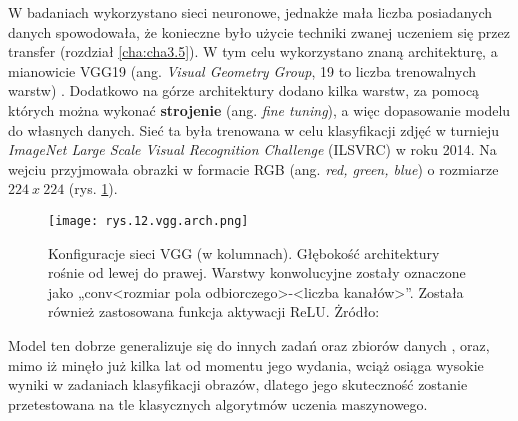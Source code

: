 W badaniach wykorzystano sieci neuronowe, jednakże mała liczba posiadanych danych spowodowała, że konieczne było użycie techniki zwanej uczeniem się przez transfer (rozdział \ref{cha:cha3.5}). W tym celu wykorzystano znaną architekturę, a mianowicie VGG19 (ang. \textit{Visual Geometry Group}, 19 to liczba trenowalnych warstw) \cite{Simonyan15}. Dodatkowo na górze architektury dodano kilka warstw, za pomocą których można wykonać \textbf{strojenie} (ang. \textit{fine tuning}), a więc dopasowanie modelu do własnych danych. Sieć ta była trenowana w celu klasyfikacji zdjęć w turnieju \textit{ImageNet Large Scale Visual Recognition Challenge} (ILSVRC) w roku 2014. Na wejciu przyjmowała obrazki w formacie RGB (ang. \textit{red, green, blue}) o rozmiarze $224~x~224$ (rys. \ref{fig:mesh12}). 
\begin{figure}[h]
    \centering
    \texttt{[image: rys.12.vgg.arch.png]}
    \caption{Konfiguracje sieci VGG (w kolumnach). Głębokość architektury rośnie od lewej do prawej. Warstwy konwolucyjne zostały oznaczone jako „conv<rozmiar pola odbiorczego>-<liczba kanałów>”. Została również zastosowana funkcja aktywacji ReLU. Żródło: \cite{Simonyan15}}
    \label{fig:mesh12}
\end{figure}
Model ten dobrze generalizuje się do innych zadań oraz zbiorów danych \cite{Simonyan15}, oraz, mimo iż minęło już kilka lat od momentu jego wydania, wciąż osiąga wysokie wyniki w zadaniach klasyfikacji obrazów, dlatego jego skuteczność zostanie przetestowana na tle klasycznych algorytmów uczenia maszynowego. 































































